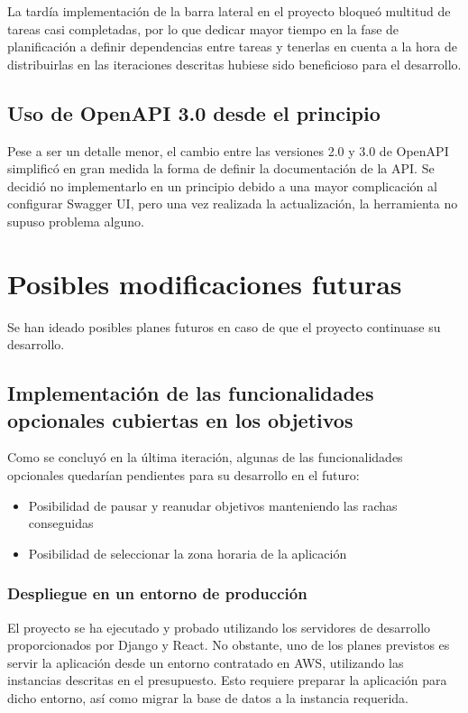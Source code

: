\documentclass[10pt, a4paper]{aqademic}
\begin{document}
La tardía implementación de la barra lateral en el proyecto bloqueó multitud de tareas casi completadas, por lo que dedicar mayor tiempo en la fase de planificación a definir dependencias entre tareas y tenerlas en cuenta a la hora de distribuirlas en las iteraciones descritas hubiese sido beneficioso para el desarrollo.


\subsection*{Uso de OpenAPI 3.0 desde el principio}

Pese a ser un detalle menor, el cambio entre las versiones 2.0 y 3.0 de OpenAPI simplificó en gran medida la forma de definir la documentación de la API. Se decidió no implementarlo en un principio debido a una mayor complicación al configurar Swagger UI, pero una vez realizada la actualización, la herramienta no supuso problema alguno.


\section{Posibles modificaciones futuras}

Se han ideado posibles planes futuros en caso de que el proyecto continuase su desarrollo.

\subsection*{Implementación de las funcionalidades opcionales cubiertas en los objetivos}

Como se concluyó en la última iteración, algunas de las funcionalidades opcionales quedarían pendientes para su desarrollo en el futuro:

\begin{itemize}
	\item Posibilidad de pausar y reanudar objetivos manteniendo las rachas conseguidas
	\item Posibilidad de seleccionar la zona horaria de la aplicación
\end{itemize}


\subsubsection*{Despliegue en un entorno de producción}

El proyecto se ha ejecutado y probado utilizando los servidores de desarrollo proporcionados por Django y React. No obstante, uno de los planes previstos es 
servir la aplicación desde un entorno contratado en AWS, utilizando las instancias descritas en el presupuesto. Esto requiere preparar la aplicación para dicho entorno, así como migrar la base de datos a la instancia requerida.
\end{document}

